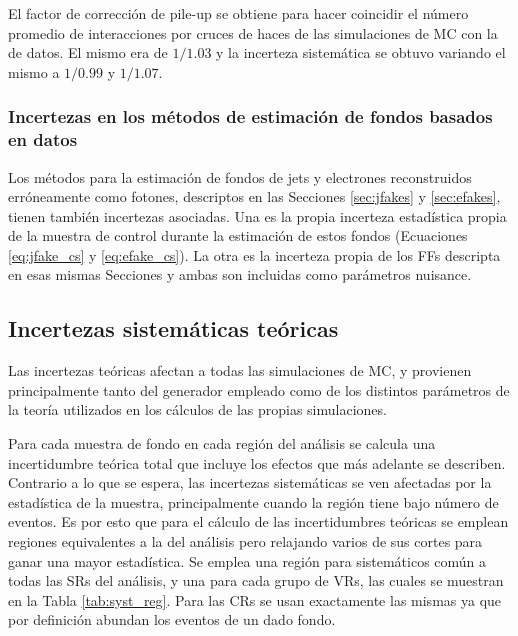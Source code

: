 El factor de corrección de pile-up se obtiene para hacer coincidir el número promedio de interacciones por cruces de haces de las simulaciones de MC con la de datos. El mismo era de $1/1.03$ y  la incerteza sistemática se obtuvo variando el mismo a $1/0.99$ y $1/1.07$. 

\subsubsection{Incertezas en los métodos de estimación de fondos basados en datos}

Los métodos para la estimación de fondos de jets y electrones reconstruidos erróneamente como fotones, descriptos en las Secciones \ref{sec:jfakes} y \ref{sec:efakes}, tienen también incertezas asociadas. Una es la propia incerteza estadística propia de la muestra de control durante la estimación de estos fondos (Ecuaciones \ref{eq:jfake_cs} y \ref{eq:efake_cs}). La otra es la incerteza propia de los FFs descripta en esas mismas Secciones y ambas son incluidas como parámetros nuisance.


\subsection{Incertezas sistemáticas teóricas}

Las incertezas teóricas afectan a todas las simulaciones de MC, y provienen principalmente tanto del generador empleado como de los distintos parámetros de la teoría utilizados en los cálculos de las propias simulaciones. 

Para cada muestra de fondo en cada región del análisis se calcula una incertidumbre teórica total que incluye los efectos que más adelante se describen. Contrario a lo que se espera, las incertezas sistemáticas se ven afectadas por la estadística de la muestra, principalmente cuando la región tiene bajo número de eventos. Es por esto que para el cálculo de las incertidumbres teóricas se emplean regiones equivalentes a la del análisis pero relajando varios de sus cortes para ganar una mayor estadística. Se emplea una región para sistemáticos común a todas las SRs del análisis, y una para cada grupo de VRs, las cuales se muestran en la Tabla \ref{tab:syst_reg}. Para las CRs se usan exactamente las mismas ya que por definición abundan los eventos de un dado fondo.

